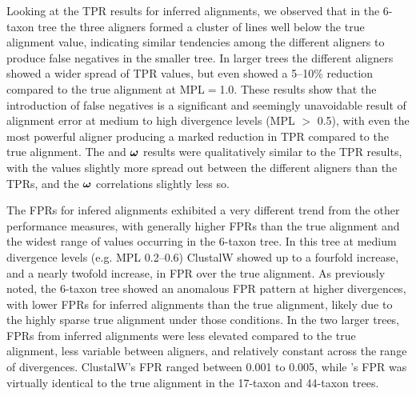 \documentclass{article}
\begin{document}
Looking at the TPR results for inferred alignments, we observed that
in the 6-taxon tree the three aligners formed a cluster of lines well
below the true alignment value, indicating similar tendencies among
the different aligners to produce false negatives in the smaller
tree. In larger trees the different aligners showed a wider spread of
TPR values, but even \prankc{} showed a 5--10\% reduction compared to
the true alignment at MPL$=$1.0. These results show that the
introduction of false negatives is a significant and seemingly
unavoidable result of alignment error at medium to high divergence
levels (MPL $>$ 0.5), with even the most powerful aligner producing a
marked reduction in TPR compared to the true alignment. The \tpr and
$\bm{\omega}$ results were qualitatively similar to the TPR results, with the
\tpr values slightly more spread out between the different aligners
than the TPRs, and the $\bm{\omega}$ correlations slightly less so.

The FPRs for infered alignments exhibited a very different trend from
the other performance measures, with generally higher FPRs than the
true alignment and the widest range of values occurring in the 6-taxon
tree. In this tree at medium divergence levels (e.g. MPL 0.2--0.6)
ClustalW showed up to a fourfold increase, and \prankc{} a nearly
twofold increase, in FPR over the true alignment. As previously noted,
the 6-taxon tree showed an anomalous FPR pattern at higher
divergences, with lower FPRs for inferred alignments than the true
alignment, likely due to the highly sparse true alignment under those
conditions. In the two larger trees, FPRs from inferred alignments
were less elevated compared to the true alignment, less variable
between aligners, and relatively constant across the range of
divergences. ClustalW's FPR ranged between 0.001 to 0.005, while
\prankc{}'s FPR was virtually identical to the true alignment in the
17-taxon and 44-taxon trees.
\end{document}
